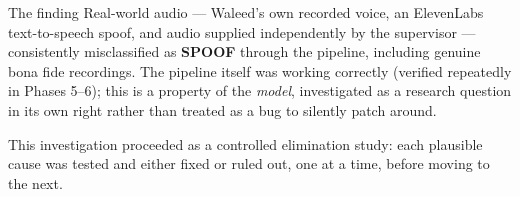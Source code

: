 \documentclass[11pt,a4paper]{report}
\begin{document}
\begin{crisisbox}{The finding}
Real-world audio --- Waleed's own recorded voice, an ElevenLabs text-to-speech spoof, and audio
supplied independently by the supervisor --- consistently misclassified as \textbf{SPOOF} through
the pipeline, including genuine bona fide recordings. The pipeline itself was working correctly
(verified repeatedly in Phases 5--6); this is a property of the \emph{model}, investigated as a
research question in its own right rather than treated as a bug to silently patch around.
\end{crisisbox}

This investigation proceeded as a controlled elimination study: each plausible cause was tested and
either fixed or ruled out, one at a time, before moving to the next.

\begin{figure}[H]
\centering
{}
\end{figure}
\end{document}
